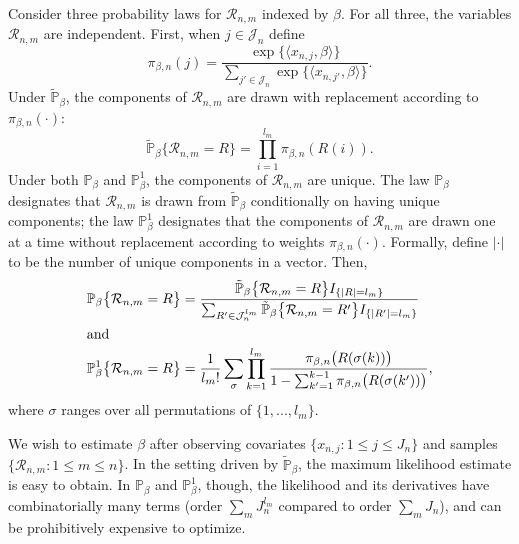 \documentclass[aoas,preprint]{imsart}
\begin{document}
Consider three probability laws for $\mathcal{R}_{n,m}$ indexed by
$\beta$.  For all three, the variables $\mathcal{R}_{n,m}$ are independent.
First, when $j \in \mathcal{J}_n$ define
\[
    \pi_{\beta, n}(j)
    =
    \frac{\exp\big\{\langle x_{n,j}, \beta \rangle\big\}}
         {\sum_{j' \in \mathcal{J}_n}
            \exp\big\{\langle x_{n,j'}, \beta \rangle\big\}}.
\]
Under $\tilde{\mathbb{P}}_\beta$, the components of $\mathcal{R}_{n,m}$ are
drawn with replacement according to $\pi_{\beta, n}(\cdot)$:
\begin{equation}
    \tilde{\mathbb{P}}_\beta\big\{ \mathcal{R}_{n,m} = R \big\}
    =
    \prod_{i = 1}^{l_m}
        \pi_{\beta, n}(R(i)).
\end{equation}
Under both $\mathbb{P}_\beta$ and $\mathbb{P}^1_\beta$, the components
of $\mathcal{R}_{n,m}$ are unique.
The law $\mathbb{P}_\beta$ designates that 
$\mathcal{R}_{n,m}$ is drawn from $\tilde{\mathbb{P}}_\beta$
conditionally on having unique components;
the law $\mathbb{P}^1_\beta$ designates that the components of
$\mathcal{R}_{n,m}$ are drawn one at a time without replacement according to
weights $\pi_{\beta,n}(\cdot)$.  Formally, define $|\cdot|$ to be the number
of unique components in a vector.  Then,
\begin{align}
    \mathbb{P}_\beta\big\{ \mathcal{R}_{n,m} = R \big\}
        &=
        \frac{
            \tilde{\mathbb{P}}_\beta\big\{ \mathcal{R}_{n,m} = R \big\}
            I_{\{|R| = l_m\}}
        }{
            \sum_{R' \in \mathcal{J}_n^{l_m}}
                \tilde{\mathbb{P}}_\beta\big\{ \mathcal{R}_{n,m} = R' \big\}
                I_{\{|R'| = l_m\}}                
        } \\
\intertext{and}
    \mathbb{P}^1_\beta\big\{ \mathcal{R}_{n,m} = R \big\}
        &=
        \frac{1}{l_m !}
        \sum_{\sigma}
        \prod_{k=1}^{l_m}
            \frac{
                \pi_{\beta,n}\big(R(\sigma(k))\big)
            }{
                1 - \sum_{k' = 1}^{k - 1} \pi_{\beta,n}\big(R(\sigma(k'))\big)
            },
\end{align}
where $\sigma$ ranges over all permutations of $\{ 1, ..., l_m \}$.



We wish to estimate $\beta$ after observing covariates
$\{ x_{n,j} : 1 \leq j \leq J_n \}$ and samples
$\{\mathcal{R}_{n,m} : 1 \leq m \leq n\}$.  In the setting driven by
$\tilde{\mathbb{P}}_\beta$, the maximum likelihood estimate is easy to
obtain.  In $\mathbb{P}_\beta$ and $\mathbb{P}^1_\beta$, though, the
likelihood and its derivatives have combinatorially many terms
(order $\sum_m J_n^{l_m}$ compared to order $\sum_m J_n$), and can be
prohibitively expensive to optimize.
\end{document}
